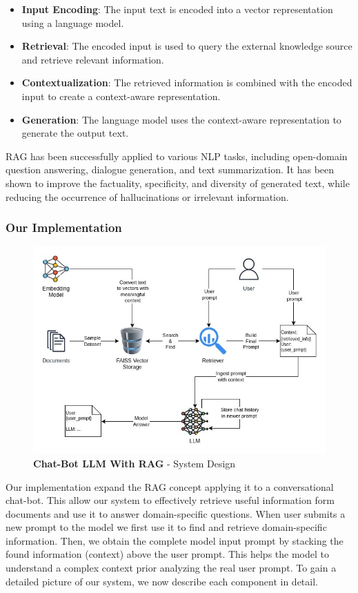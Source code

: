 \documentclass{article}
\begin{document}
	\begin{itemize}
		\item \textbf{Input Encoding}: The input text is encoded into a vector representation using a language model.
		\item \textbf{Retrieval}: The encoded input is used to query the external knowledge source and retrieve relevant information.
		\item \textbf{Contextualization}: The retrieved information is combined with the encoded input to create a context-aware representation.
		\item \textbf{Generation}: The language model uses the context-aware representation to generate the output text.
	\end{itemize}
	
	RAG has been successfully applied to various NLP tasks, including open-domain question answering, dialogue generation, and text summarization. It has been shown to improve the factuality, specificity, and diversity of generated text, while reducing the occurrence of hallucinations or irrelevant information.
	
	\subsubsection{Our Implementation}
	
	\begin{figure}[h]
		\centering
		\includegraphics[width=13cm]{Chat_RAG}
		\caption{\textbf{Chat-Bot LLM With RAG} - System Design}
	\end{figure}
	
	Our implementation expand the RAG concept applying it to a conversational chat-bot. This allow our system to effectively retrieve useful information form documents and use it to answer domain-specific questions. 
	When user submits a new prompt to the model we first use it to find and retrieve domain-specific information. Then, we obtain the complete model input prompt by stacking the found information (context) above the user prompt.
	This helps the model to understand a complex context prior analyzing the real user prompt.
	To gain a detailed picture of our system, we now describe each component in detail.
	
\end{document}
